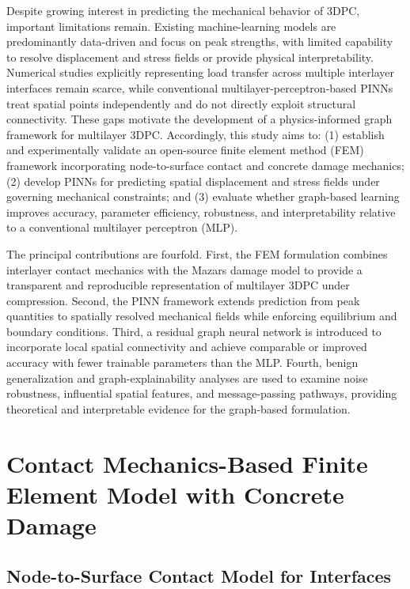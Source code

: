 \documentclass[review, authoryear, 12pt]{elsarticle}
\begin{document}
Despite growing interest in predicting the mechanical behavior of 3DPC, important limitations remain. Existing machine-learning models are predominantly data-driven and focus on peak strengths, with limited capability to resolve displacement and stress fields or provide physical interpretability. Numerical studies explicitly representing load transfer across multiple interlayer interfaces remain scarce, while conventional multilayer-perceptron-based PINNs treat spatial points independently and do not directly exploit structural connectivity. These gaps motivate the development of a physics-informed graph framework for multilayer 3DPC. Accordingly, this study aims to: (1) establish and experimentally validate an open-source finite element method (FEM) framework incorporating node-to-surface contact and concrete damage mechanics; (2) develop PINNs for predicting spatial displacement and stress fields under governing mechanical constraints; and (3) evaluate whether graph-based learning improves accuracy, parameter efficiency, robustness, and interpretability relative to a conventional multilayer perceptron (MLP).

The principal contributions are fourfold. First, the FEM formulation combines interlayer contact mechanics with the Mazars damage model to provide a transparent and reproducible representation of multilayer 3DPC under compression. Second, the PINN framework extends prediction from peak quantities to spatially resolved mechanical fields while enforcing equilibrium and boundary conditions. Third, a residual graph neural network is introduced to incorporate local spatial connectivity and achieve comparable or improved accuracy with fewer trainable parameters than the MLP. Fourth, benign generalization and graph-explainability analyses are used to examine noise robustness, influential spatial features, and message-passing pathways, providing theoretical and interpretable evidence for the graph-based formulation.

\section{Contact Mechanics-Based Finite Element Model with Concrete Damage}

\subsection{Node-to-Surface Contact Model for Interfaces}
\label{subsec:node_to_surface}
\end{document}
